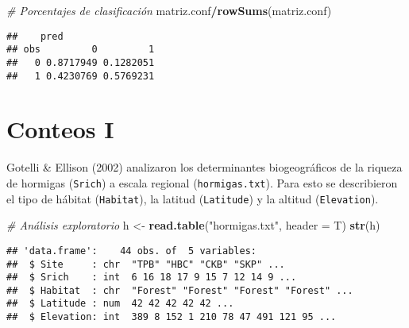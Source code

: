 \documentclass[
]{book}
\newenvironment{Shaded}{\begin{snugshade}}{\end{snugshade}}
\newcommand{\CommentTok}[1]{\textcolor[rgb]{0.56,0.35,0.01}{\textit{#1}}}
\newcommand{\DataTypeTok}[1]{\textcolor[rgb]{0.13,0.29,0.53}{#1}}
\newcommand{\DecValTok}[1]{\textcolor[rgb]{0.00,0.00,0.81}{#1}}
\newcommand{\KeywordTok}[1]{\textcolor[rgb]{0.13,0.29,0.53}{\textbf{#1}}}
\newcommand{\NormalTok}[1]{#1}
\newcommand{\OperatorTok}[1]{\textcolor[rgb]{0.81,0.36,0.00}{\textbf{#1}}}
\newcommand{\StringTok}[1]{\textcolor[rgb]{0.31,0.60,0.02}{#1}}
\begin{document}
\begin{Shaded}
\begin{Highlighting}[]
\CommentTok{# Porcentajes de clasificación}
\NormalTok{matriz.conf}\OperatorTok{/}\KeywordTok{rowSums}\NormalTok{(matriz.conf)}
\end{Highlighting}
\end{Shaded}

\begin{verbatim}
##    pred
## obs         0         1
##   0 0.8717949 0.1282051
##   1 0.4230769 0.5769231
\end{verbatim}

\hypertarget{conteos-i}{%
\section{Conteos I}\label{conteos-i}}

Gotelli \& Ellison (2002) analizaron los determinantes biogeográficos de la riqueza de hormigas (\texttt{Srich}) a escala regional (\texttt{hormigas.txt}). Para esto se describieron el tipo de hábitat (\texttt{Habitat}), la latitud (\texttt{Latitude}) y la altitud (\texttt{Elevation}).

\begin{Shaded}
\begin{Highlighting}[]
\CommentTok{# Análisis exploratorio}
\NormalTok{h <-}\StringTok{ }\KeywordTok{read.table}\NormalTok{(}\StringTok{"hormigas.txt"}\NormalTok{, }\DataTypeTok{header =}\NormalTok{ T) }
\KeywordTok{str}\NormalTok{(h)}
\end{Highlighting}
\end{Shaded}

\begin{verbatim}
## 'data.frame':    44 obs. of  5 variables:
##  $ Site     : chr  "TPB" "HBC" "CKB" "SKP" ...
##  $ Srich    : int  6 16 18 17 9 15 7 12 14 9 ...
##  $ Habitat  : chr  "Forest" "Forest" "Forest" "Forest" ...
##  $ Latitude : num  42 42 42 42 42 ...
##  $ Elevation: int  389 8 152 1 210 78 47 491 121 95 ...
\end{verbatim}

\begin{Shaded}
\end{Shaded}
\end{document}
